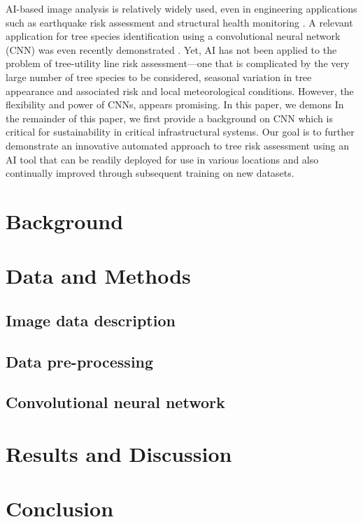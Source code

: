 \documentclass[11pt,twoside]{article}
\numberwithin{equation}{section}
\newcommand{\?}{\stackrel{?}{=}}
\begin{document}
AI-based image analysis is relatively widely used, even in engineering applications such as earthquake risk assessment
\cite{jiao2020artificial,salehi2018emerging} and structural health monitoring \cite{spencer2019advances}. A relevant
application for tree species identification using a convolutional neural network (CNN) was even recently demonstrated
\cite{fricker2019convolutional}. Yet, AI has not been applied to the problem of tree-utility line risk assessment---one that is
complicated by the very large number of tree species to be considered, seasonal variation in tree appearance and
associated risk and local meteorological conditions. However, the flexibility and power of CNNs, appears promising. In
this paper, we demons In the remainder of this paper, we first provide a background on CNN which is critical for
sustainability in critical infrastructural systems. Our goal is to further demonstrate an innovative automated approach
to tree risk assessment using an AI tool that can be readily deployed for use in various locations and also continually
improved through subsequent training on new datasets.

\section{Background}

 


\section{Data and Methods}
\subsection{Image data description}

\subsection{Data pre-processing}

\subsection{Convolutional neural network}

\section{Results and Discussion}


\section{Conclusion}

\printbibliography

\appendix
\end{document}
